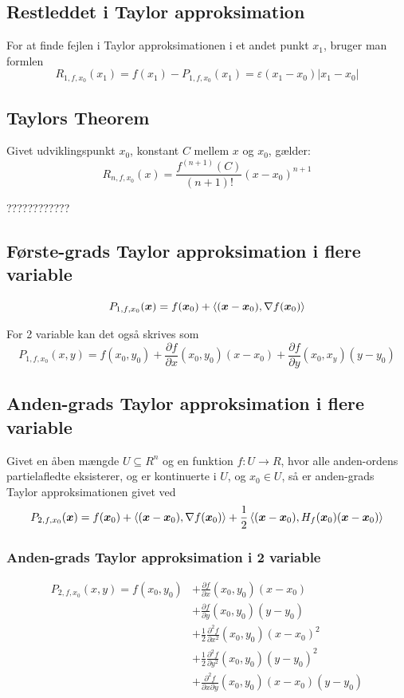 \subsection{Restleddet i Taylor approksimation}
For at finde fejlen i Taylor approksimationen i et andet punkt $x_1$, bruger man formlen
\[
    R_{1,f,x_0}(x_1) 
    = f(x_1) - P_{1,f,x_0}(x_1) 
    = \varepsilon(x_1-x_0) |x_1-x_0|
\]

\subsection{Taylors Theorem}
Givet udviklingspunkt $x_0$, konstant $C$ mellem $x$ og $x_0$, gælder:
\[
R_{n,f,x_0}(x)
= \frac{f^{(n+1)}(C)}{(n+1)!}(x - x_0)^{n+1}
\]

????????????

\subsection{Første-grads Taylor approksimation i flere variable}
\[
    P_{1,f,x_0}(\boldsymbol{x}) = f(\boldsymbol{x}_0) + \left \langle (\boldsymbol{x} - \boldsymbol{x}_0), \nabla f(\boldsymbol{x}_0) \right \rangle
\]

For 2 variable kan det også skrives som
\[
    P_{1,f,x_0}(x, y) = f(x_0, y_0) + \frac{\partial f}{\partial x}(x_0, y_0)(x-x_0) + \frac{\partial f}{\partial y}(x_0, x_y)(y-y_0)
\]

\subsection{Anden-grads Taylor approksimation i flere variable}
Givet en åben mængde $U \subseteq R^n$ og en funktion $f: U \to R$, hvor alle anden-ordens partielafledte eksisterer, og er kontinuerte i $U$,
og $x_0 \in U$, så er anden-grads Taylor approksimationen givet ved
\[
    P_{2,f,x_0}(\boldsymbol{x}) = f(\boldsymbol{x}_0) 
    + \left \langle (\boldsymbol{x} - \boldsymbol{x}_0), \nabla f(\boldsymbol{x}_0) \right \rangle 
    + \frac{1}{2} \left \langle (\boldsymbol{x} - \boldsymbol{x}_0), H_f(\boldsymbol{x}_0)(\boldsymbol{x} - \boldsymbol{x}_0) \right \rangle
\]

\subsubsection{Anden-grads Taylor approksimation i 2 variable}
\begin{align*}
    P_{2,f,x_0}(x, y) = f(x_0, y_0) &+ \frac{\partial f}{\partial x}(x_0, y_0)(x-x_0) \\ 
    &+ \frac{\partial f}{\partial y}(x_0, y_0)(y-y_0) \\
    &+ \frac{1}{2} \frac{\partial^2 f}{\partial x^2}(x_0, y_0)(x-x_0)^2 \\
    &+ \frac{1}{2} \frac{\partial^2 f}{\partial y^2}(x_0, y_0)(y-y_0)^2 \\
    &+ \frac{\partial^2 f}{\partial x \partial y}(x_0, y_0)(x-x_0)(y-y_0)
\end{align*}

